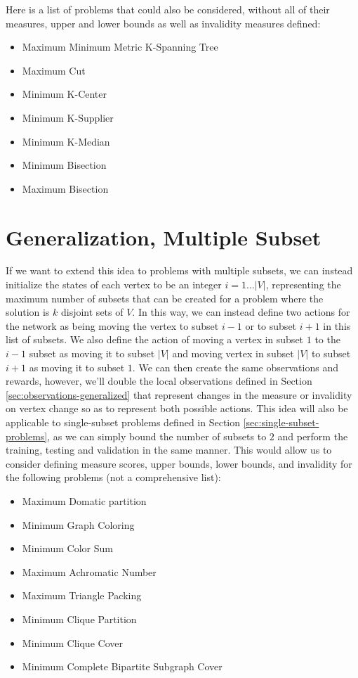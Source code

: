\documentclass{article}
\begin{document}
    Here is a list of problems that could also be considered, without all of their measures, upper and lower bounds as well as invalidity measures defined:
    \begin{itemize}
        \item Maximum Minimum Metric K-Spanning Tree 
        \item Maximum Cut 
        \item Minimum K-Center
        \item Minimum K-Supplier
        \item Minimum K-Median
        \item Minimum Bisection
        \item Maximum Bisection
    \end{itemize}

\section{Generalization, Multiple Subset}\label{sec:multi-subset}

If we want to extend this idea to problems with multiple subsets, we can instead initialize the states of each vertex to be an integer $i = 1 ... |V|$, representing the maximum number of subsets that can be created for a problem where the solution is $k$ disjoint sets of $V$. In this way, we can instead define two actions for the network as being moving the vertex to subset $i - 1$ or to subset $i + 1$ in this list of subsets. We also define the action of moving a vertex in subset $1$ to the $i-1$ subset as moving it to subset $|V|$ and moving vertex in subset $|V|$ to subset $i+1$ as moving it to subset $1$. We can then create the same observations and rewards, however, we'll double the local observations defined in Section \ref{sec:observations-generalized} that represent changes in the measure or invalidity on vertex change so as to represent both possible actions. This idea will also be applicable to single-subset problems defined in Section \ref{sec:single-subset-problems}, as we can simply bound the number of subsets to $2$ and perform the training, testing and validation in the same manner. This would allow us to consider defining measure scores, upper bounds, lower bounds, and invalidity for the following problems (not a comprehensive list):

\begin{itemize}
    \item Maximum Domatic partition
    \item Minimum Graph Coloring
    \item Minimum Color Sum 
    \item Maximum Achromatic Number 
    \item Maximum Triangle Packing
    \item Minimum Clique Partition
    \item Minimum Clique Cover
    \item Minimum Complete Bipartite Subgraph Cover 
\end{itemize}
\end{document}
